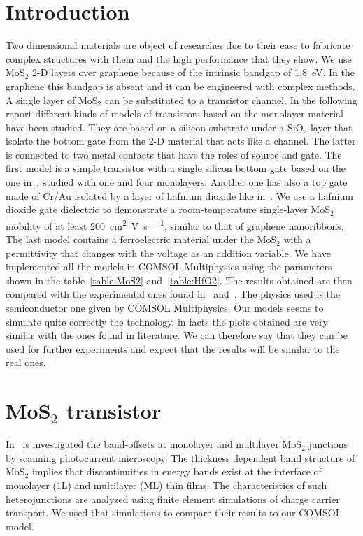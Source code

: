 \documentclass[12pt,a4paper,titlepage]{article}
\begin{document}
\section{Introduction}
Two dimensional materials are object of researches due to their ease to fabricate complex structures with them and the high performance that they show.
We use MoS$_2$ 2-D layers over graphene because of the intrinsic bandgap of \SI{1.8}{\electronvolt}. In the graphene this bandgap is absent and it can be engineered with complex methods.
A single layer of MoS$_2$ can be substituted to a transistor channel.
In the following report different kinds of models of transistors based on the monolayer material have been studied.
They are based on a silicon substrate under a SiO$_2$ layer that isolate the bottom gate from the 2-D material that acts like a channel. The latter is connected to two metal contacts that have the roles of source and gate.
The first model is a simple transistor with a single silicon bottom gate based on the one in~\cite{Howell:MonolayerMultiLayer_MoS2}, studied with one and four monolayers.
Another one has also a top gate made of Cr/Au isolated by a layer of hafnium dioxide like in~\cite{Radisavljevic:Si_MoS2}.
We use a hafnium dioxide gate dielectric to demonstrate a room-temperature single-layer MoS$_2$ mobility of at least \SI{200}{\square \centi \meter \per \volt \per \second}, similar to that of graphene nanoribbons.
The last model contains a ferroelectric material under the MoS$_2$ with a permittivity that changes with the voltage as an addition variable.
We have implemented all the models in COMSOL Multiphysics using the parameters shown in the table~\ref{table:MoS2} and~\ref{table:HfO2}. The results obtained are then compared with the experimental ones found in~\cite{Howell:MonolayerMultiLayer_MoS2} and~\cite{Radisavljevic:Si_MoS2}. The physics used is the semiconductor one given by COMSOL Multiphysics.
Our models seems to simulate quite correctly the technology, in facts the plots obtained are very similar with the ones found in literature.
We can therefore say that they can be used for further experiments and expect that the results will be similar to the real ones.

\newpage
\section{MoS$_2$ transistor}

In~\cite{Howell:MonolayerMultiLayer_MoS2} is investigated the band-offsets at monolayer and multilayer MoS$_2$ junctions by scanning photocurrent microscopy. The thickness dependent band structure of MoS$_2$ implies that discontinuities in energy bands exist at the interface of monolayer (1L) and multilayer (ML) thin films. The characteristics of such heterojunctions are analyzed using finite element simulations of charge carrier transport. We used that simulations to compare their results to our COMSOL model.
\end{document}
